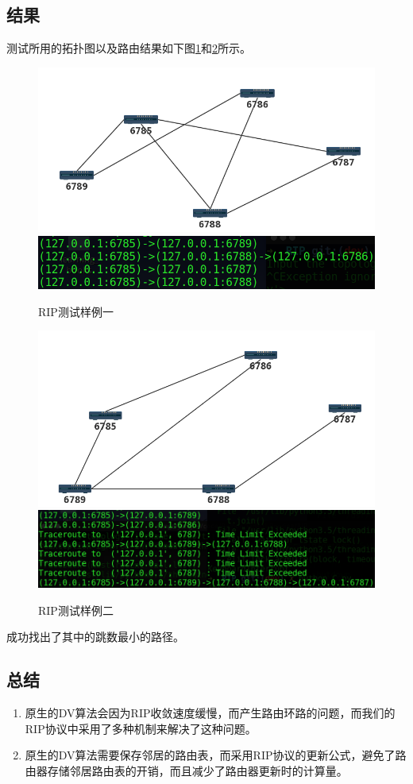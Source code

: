 	\subsection{结果} %
	\label{sub:结果}
		测试所用的拓扑图以及路由结果如下图\ref{fig:ripTest1}和\ref{fig:ripTest2}所示。
		\begin{figure}[H]
			\centering
			\includegraphics[scale=0.4]{imgs/topo1/tpop1.png}
			\includegraphics[scale=0.5]{imgs/ripTest1.PNG}
			\caption{RIP测试样例一}
			\label{fig:ripTest1}
		\end{figure}
		\begin{figure}[H]
			\centering
			\includegraphics[scale=0.4]{imgs/topo1/topo2.png}
			\includegraphics[scale=0.4]{imgs/ripTest2.PNG}
			\caption{RIP测试样例二}
			\label{fig:ripTest2}
		\end{figure}
		成功找出了其中的跳数最小的路径。
	\subsection{总结} %
	\label{sub:总结}
		\begin{enumerate}
			\item 原生的DV算法会因为RIP收敛速度缓慢，而产生路由环路的问题，而我们的RIP协议中采用了多种机制来解决了这种问题。
			\item 原生的DV算法需要保存邻居的路由表，而采用RIP协议的更新公式，避免了路由器存储邻居路由表的开销，而且减少了路由器更新时的计算量。
		\end{enumerate}
	


